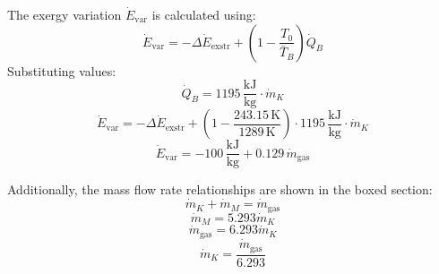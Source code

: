 The exergy variation \( \dot{E}_{\text{var}} \) is calculated using:  
\[
\dot{E}_{\text{var}} = -\Delta \dot{E}_{\text{exstr}} + \left( 1 - \frac{T_0}{\bar{T}_B} \right) \dot{Q}_B
\]  
Substituting values:  
\[
\dot{Q}_B = 1195 \, \frac{\text{kJ}}{\text{kg}} \cdot \dot{m}_K
\]  
\[
\dot{E}_{\text{var}} = -\Delta \dot{E}_{\text{exstr}} + \left( 1 - \frac{243.15 \, \text{K}}{1289 \, \text{K}} \right) \cdot 1195 \, \frac{\text{kJ}}{\text{kg}} \cdot \dot{m}_K
\]  
\[
\dot{E}_{\text{var}} = -100 \, \frac{\text{kJ}}{\text{kg}} + 0.129 \, \dot{m}_{\text{gas}}
\]  

Additionally, the mass flow rate relationships are shown in the boxed section:  
\[
\dot{m}_K + \dot{m}_M = \dot{m}_{\text{gas}}
\]  
\[
\dot{m}_M = 5.293 \dot{m}_K
\]  
\[
\dot{m}_{\text{gas}} = 6.293 \dot{m}_K
\]  
\[
\dot{m}_K = \frac{\dot{m}_{\text{gas}}}{6.293}
\]